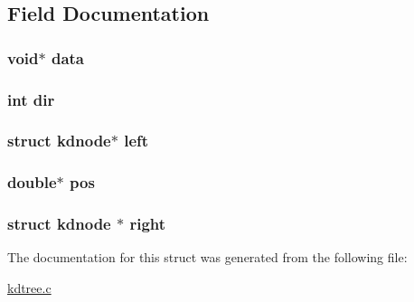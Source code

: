 \subsection{\-Field \-Documentation}
\hypertarget{a00009_a735984d41155bc1032e09bece8f8d66d_a735984d41155bc1032e09bece8f8d66d}{
\subsubsection[{data}]{\setlength{\rightskip}{0pt plus 5cm}void$\ast$ {\bf data}}}\label{da/da0/a00009_a735984d41155bc1032e09bece8f8d66d_a735984d41155bc1032e09bece8f8d66d}
\hypertarget{a00009_a851cf68c8f607573c1a5e987784c83f6_a851cf68c8f607573c1a5e987784c83f6}{
\subsubsection[{dir}]{\setlength{\rightskip}{0pt plus 5cm}int {\bf dir}}}\label{da/da0/a00009_a851cf68c8f607573c1a5e987784c83f6_a851cf68c8f607573c1a5e987784c83f6}
\hypertarget{a00009_a77fe629b496db8e95613fa6520af4371_a77fe629b496db8e95613fa6520af4371}{
\subsubsection[{left}]{\setlength{\rightskip}{0pt plus 5cm}struct {\bf kdnode}$\ast$ {\bf left}}}\label{da/da0/a00009_a77fe629b496db8e95613fa6520af4371_a77fe629b496db8e95613fa6520af4371}
\hypertarget{a00009_a1a6076b5177bd7af0d55bc0e8c21fde3_a1a6076b5177bd7af0d55bc0e8c21fde3}{
\subsubsection[{pos}]{\setlength{\rightskip}{0pt plus 5cm}double$\ast$ {\bf pos}}}\label{da/da0/a00009_a1a6076b5177bd7af0d55bc0e8c21fde3_a1a6076b5177bd7af0d55bc0e8c21fde3}
\hypertarget{a00009_ad73ae7970017da6a7f7fafc2e889bb51_ad73ae7970017da6a7f7fafc2e889bb51}{
\subsubsection[{right}]{\setlength{\rightskip}{0pt plus 5cm}struct {\bf kdnode} $\ast$ {\bf right}}}\label{da/da0/a00009_ad73ae7970017da6a7f7fafc2e889bb51_ad73ae7970017da6a7f7fafc2e889bb51}


\-The documentation for this struct was generated from the following file\-:\begin{DoxyCompactItemize}
\item 
\hyperlink{a00013}{kdtree.\-c}\end{DoxyCompactItemize}
